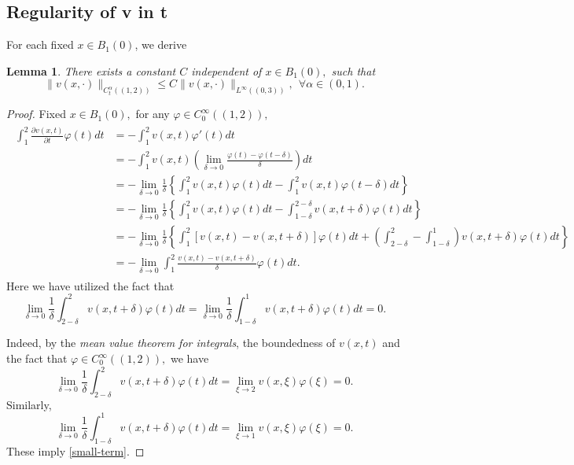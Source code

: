 \documentclass[12pt]{article}
\newtheorem{lemma}[definition]{Lemma}
\theoremstyle{remark}
\numberwithin{equation}{section}
\begin{document}
\subsection{Regularity of v in t}

For each fixed $x \in B_1(0)$, we derive

\begin{lemma} \label{thm2.1.2}
There exists a constant $C$ independent of $x\in B_1(0),$ such that
$$
\|v(x,\cdot)\|_{C^{\alpha}_{t} ((1,2))} \leq C \|v(x,\cdot)\|_{L^\infty ((0,3))},\ \ \forall \alpha\in(0,1).
$$
\end{lemma}


\begin{proof} Fixed $x\in B_1(0),$ for any $\varphi\in C_0^\infty((1,2)),$
\begin{eqnarray}\label{est-t}
\begin{aligned}
\int_1^2\frac{\partial v(x,t)}{\partial t}\varphi(t)dt&=-\int_1^2v(x,t)\varphi'(t)dt\\
&=-\int_1^2v(x,t)\left(\lim\limits_{\delta\to 0}\frac{\varphi(t)-\varphi(t-\delta)}{\delta}\right)dt\\
&=-\lim\limits_{\delta\to 0}\frac{1}{\delta}\left\{\int_1^2v(x,t)\varphi(t)dt-\int_1^2v(x,t)\varphi(t-\delta)dt\right\}\\
&=-\lim\limits_{\delta\to 0}\frac{1}{\delta}\left\{\int_1^2v(x,t)\varphi(t)dt-\int_{1-\delta}^{2-\delta}v(x,t+\delta)\varphi(t)dt\right\}\\
&=-\lim\limits_{\delta\to 0}\frac{1}{\delta}\left\{\int_1^2[v(x,t)-v(x,t+\delta)]\varphi(t)dt+\left(\int_{2-\delta}^{2}
-\int_{1-\delta}^{1}\right)v(x,t+\delta)\varphi(t)dt\right\}\\
&=-\lim\limits_{\delta\to 0}\int_1^2\frac{v(x,t)-v(x,t+\delta)}{\delta}\varphi(t)dt.
\end{aligned}
\end{eqnarray}
Here we have utilized the fact that
\begin{equation}\label{small-term}\lim\limits_{\delta\to 0}\frac{1}{\delta}\int_{2-\delta}^{2}v(x,t+\delta)\varphi(t)dt=\lim\limits_{\delta\to 0}\frac{1}{\delta}\int_{1-\delta}^{1}v(x,t+\delta)\varphi(t)dt=0.\end{equation}

Indeed, by the {\em mean value theorem for integrals},   the boundedness of $v(x,t)$ and the fact that $\varphi\in C_0^\infty((1,2)),$ we have
\[\lim\limits_{\delta\to 0}\frac{1}{\delta}\int_{2-\delta}^{2}v(x,t+\delta)\varphi(t)dt=\lim\limits_{\xi\to 2}v(x,\xi)\varphi(\xi)=0.\]
Similarly,
\[\lim\limits_{\delta\to 0}\frac{1}{\delta}\int_{1-\delta}^{1}v(x,t+\delta)\varphi(t)dt=\lim\limits_{\xi\to 1}v(x,\xi)\varphi(\xi)=0.\]
These imply \eqref{small-term}.


\end{proof}
\end{document}
